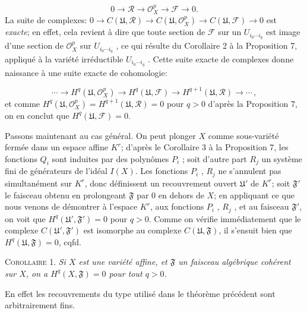 \begin{equation*}
0 \to \mathcal{R} \to \mathcal{O}_X^p \to \mathcal{F} \to 0.
\end{equation*}
La suite de complexes: $0 \to C(\mathfrak{U}, \mathcal{R}) \to C(\mathfrak{U}, \mathcal{O}_X^p) \to C(\mathfrak{U}, \mathcal{F}) \to 0$ est \textit{exacte}; en effet, cela revient à dire que toute section de $\mathcal{F}$ sur un $U_{i_0\cdots i_q}$ est image d'une section de $\mathcal{O}_X^p$ sur $U_{i_0\cdots i_q}$ , ce qui résulte du Corollaire 2 à la Proposition 7, appliqué à la variété irréductible $U_{i_0\cdots i_q}$ . Cette suite exacte de complexes donne naissance à une suite exacte de cohomologie:

\begin{equation*}
\cdots \to H^q(\mathfrak{U}, \mathcal{O}_X^p) \to H^q(\mathfrak{U}, \mathcal{F}) \to H^{q+1}(\mathfrak{U}, \mathcal{R}) \to \cdots \, ,
\end{equation*}
et comme $H^q(\mathfrak{U}, \mathcal{O}_X^p) = H^{q+1}(\mathfrak{U}, \mathcal{R}) = 0$ pour $q > 0$ d'après la Proposition 7, on en conclut que $H^q(\mathfrak{U}, \mathcal{F}) = 0$.



Passons maintenant au cas général. On peut plonger $X$ comme sous-variété fermée dans un espace affine $K^r$; d'après le Corollaire 3 à la Proposition 7, les fonctions $Q_i$ sont induites par des polynômes $P_i$ ; soit d'autre part $R_j$ un système fini de générateurs de l'idéal $I(X)$. Les fonctions $P_i$ , $R_j$ ne s'annulent pas simultanément sur $K^r$, donc définissent un recouvrement ouvert $\mathfrak{U}'$ de $K^r$; soit $\mathfrak{F}'$ le faisceau obtenu en prolongeant $\mathfrak{F}$ par 0 en dehors de $X$; en appliquant ce que nous venons de démontrer à l'espace $K^r$, aux fonctions $P_i$ , $R_j$ , et au faisceau $\mathfrak{F}'$, on voit que $H^q(\mathfrak{U}', \mathfrak{F}') = 0$ pour $q > 0$. Comme on vérifie immédiatement que le complexe $C(\mathfrak{U}', \mathfrak{F}')$ est isomorphe au complexe $C(\mathfrak{U}, \mathfrak{F})$, il s'ensuit bien que $H^q(\mathfrak{U}, \mathfrak{F}) = 0$, cqfd.

\textsc{Corollaire} 1. \textit{Si $X$ est une variété affine, et $\mathfrak{F}$ un faisceau algébrique cohérent sur $X$, on a $H^q(X, \mathfrak{F}) = 0$ pour tout $q > 0$.}

En effet les recouvrements du type utilisé dans le théorème précédent sont arbitrairement fins.

